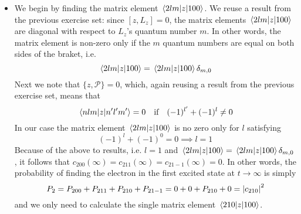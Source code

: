 \documentclass[11pt, a4paper]{article}
\renewcommand{\P}{\mathcal{P}}  %
\begin{document}
\begin{itemize}
	\item We begin by finding the matrix element $ \mel{2lm}{z}{100} $. We reuse a result from the previous exercise set: since $ [z, L_{z}] = 0 $, the matrix elements $ \mel{2lm}{z}{100} $ are diagonal with respect to $ L_{z} $'s quantum number $ m $. In other words, the matrix element is non-zero only if the $ m $ quantum numbers are equal on both sides of the braket, i.e.
	\begin{equation*}
		\mel{2lm}{z}{100} = \mel{2lm}{z}{100}\delta_{m, 0}
	\end{equation*}
	Next we note that $ \{z, \P \} = 0 $, which, again reusing a result from the previous exercise set, means that
	\begin{equation*}
		\mel{nlm}{z}{n'l'm'} = 0 \quad \text{if} \quad (-1)^{l'} + (-1)^{l} \neq 0 
	\end{equation*}
	In our case the matrix element $ \mel{2lm}{z}{100} $ is no zero only for $ l $ satisfying
	\begin{equation*}
		(-1)^{l} + (-1)^{0} = 0  \implies l = 1
	\end{equation*}
	Because of the above to results, i.e. $ l = 1 $ and $ \mel{2lm}{z}{100} = \mel{2lm}{z}{100}\delta_{m, 0} $, it follows that $ c_{200}(\infty) = c_{211}(\infty) = c_{21-1}(\infty) = 0 $. In other words, the probability of finding the electron in the first excited state at $ t \to \infty $ is simply
	\begin{equation*}
		P_{2} = P_{200} + P_{211} + P_{210} + P_{21-1} = 0 + 0 + P_{210} + 0 = \abs{c_{210}}^{2}
	\end{equation*}
	and we only need to calculate the single matrix element $ \mel{210}{z}{100} $.
	

\end{itemize}
\end{document}
